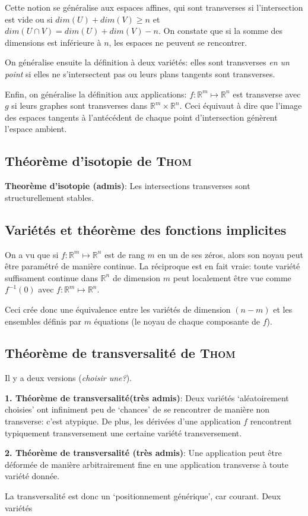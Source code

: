 \documentclass{article}
\begin{document}
Cette notion se généralise aux espaces affines, qui sont transverses si l'intersection est vide ou si $dim(U)+dim(V)\geq n$ et $dim(U\cap V)=dim(U)+dim(V)-n$. On constate que si la somme des dimensions est inférieure à $n$, les espaces ne peuvent se rencontrer.

On généralise ensuite la définition à deux variétés: elles sont transverses \textit{en un point} si elles ne s'intersectent pas ou leurs plans tangents sont transverses.

Enfin, on généralise la définition aux applications: $f:\mathbb{R}^m\mapsto\mathbb{R}^n$ est transverse avec $g$ si leurs graphes sont transverses dans $\mathbb{R}^m\times\mathbb{R}^n$.
Ceci équivaut à dire que l'image des espaces tangents à l'antécédent de chaque point d'intersection génèrent l'espace ambient.

\subsection{Théorème d'isotopie de \textsc{Thom}}

\textbf{Theorème d'isotopie (admis)}: Les intersections transverses sont structurellement stables.

\subsection{Variétés et théorème des fonctions implicites}

On a vu que si $f:\mathbb{R}^m\mapsto\mathbb{R}^n$ est de rang $m$ en un de ses zéros, alors son noyau peut être paramétré de manière continue.
La réciproque est en fait vraie: toute variété suffisament continue dans $\mathbb{R}^n$ de dimension $m$ peut localement être vue comme $f^{-1}(0)$ avec $f:\mathbb{R}^m\mapsto\mathbb{R}^n$.

Ceci crée donc une équivalence entre les variétés de dimension $(n-m)$ et les ensembles définis par $m$ équations (le noyau de chaque composante de $f$).

\subsection{Théorème de transversalité de \textsc{Thom}}

Il y a deux versions (\textit{choisir une?}).

\textbf{1. Théorème de transversalité(très admis)}: Deux variétés `aléatoirement choisies' ont infiniment peu de `chances' de se rencontrer de manière non transverse: c'est atypique.
De plus, les dérivées d'une application $f$ rencontrent typiquement transversement une certaine variété transversement.

\textbf{2. Théorème de transversalité (très admis)}: Une application peut être déformée de manière arbitrairement fine en une application transverse à toute variété donnée.

La transversalité est donc un `positionnement générique', car courant.
Deux variétés
\end{document}
